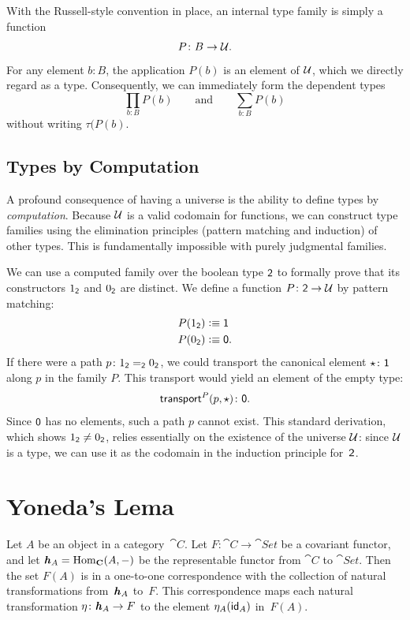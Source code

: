 \begin{ntn}
    With the Russell-style convention in place, an internal type family is simply a function
    \[
        P\colon B\to\univ.
    \]
    For any element $b\colon B$, the application $P(b)$ is an element of $\mathcal U$, which we directly regard as a type. Consequently, we can immediately form the dependent types
    \[
        \prod_{b\colon B}P(b) \qquad\text{and}\qquad \sum_{b\colon B}P(b)
    \]
    without writing $\tau(P(b)$.
\end{ntn}

\subsection*{Types by Computation}

A profound consequence of having a universe is the ability to define types by \textsl{computation}. Because $\mathcal U$ is a valid codomain for functions, we can construct type families using the elimination principles (pattern matching and induction) of other types. This is fundamentally impossible with purely judgmental families.

\begin{xmpl}
    We can use a computed family over the boolean type $\mathsf{2}$ to formally prove that its constructors $1_{\mathsf{2}}$ and $0_{\mathsf{2}}$ are distinct. We define a function $P\colon\fun2\to\univ$ by pattern matching:
    \begin{align*}
        P(1_{\mathsf{2}})&\mathrel{\vcentcolon}\equiv\mathsf{1}\\
        P(0_{\mathsf{2}})&\mathrel{\vcentcolon}\equiv\mathsf{0}.
    \end{align*}
    If there were a path $p\colon1_{\fun2}\eq{\fun2}0_{\fun2}$, we could transport the canonical element $\star\colon\fun1$ along $p$ in the family $P$. This transport would yield an element of the empty type:
    \[
        \fun{transport}^P(p,\star)\colon\fun0.
    \]
    Since $\mathsf{0}$ has no elements, such a path $p$ cannot exist. This standard derivation, which shows $1_{\mathsf{2}}\neq0_{\mathsf{2}}$, relies essentially on the existence of the universe $\mathcal U$: since $\mathcal U$ is a type, we can use it as the codomain in the induction principle for~$\mathsf{2}$.
\end{xmpl}

\section{Yoneda's Lema}

\begin{thm}\label{thm:yoneda-general}
    {} Let\/ $A$ be an object in a category\/~$\cat C$. Let\/ $F\colon\cat C\to\cat{Set}$ be a covariant functor, and let\/ $\textrm{\boldmath$\mathit h$}_A={\operatorname{Hom}}_{\mathbf{C}}(A,-)$ be the representable functor from\/ $\cat C$ to\/ $\cat{Set}$. Then the set\/ $F(A)$ is in a one-to-one correspondence with the collection of natural transformations from\/~$\textrm{\boldmath$\mathit h$}_A$ to\/~$F$. This correspondence maps each natural transformation\/ $\eta\colon\yoneda_A\to F$ to the element\/ $\eta_A(\mathsf{id}_A)$ in\/~$F(A)$.
\end{thm}

